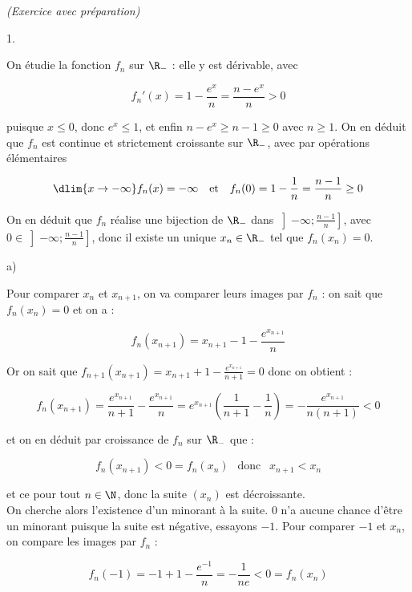 \documentclass[11pt]{article}%
\begin{document}
\begin{exercice}{\it (Exercice avec préparation)}
\begin{noliste}{1.}
 \item On étudie la fonction $f_{n}$ sur $\R_-$ : elle y est dérivable,
avec
 
\[
 f_{n} '(x) = 1 - \frac{ e^{x} }{ n } = \frac{ n - e^{x} }{ n } > 0 
\]

 puisque $x \leq 0$, donc $e^{x} \leq 1$, et enfin $ n - e^{x} \geq n -
1 \geq 0$ avec $n \geq 1$. On en déduit que $f_{n}$ est continue et
strictement croissante sur $\R_-$, avec par opérations élémentaires
 
\[
 \dlim{ x \rightarrow - \infty } f_{n} (x) = - \infty \ \ \text{ et } \
\ f_{n} (0 ) = 1 - \frac{ 1 }{ n } = \frac{ n - 1 }{ n } \geq 0 
\]

 On en déduit que $f_{n}$ réalise une bijection de $\R_-$ dans $ \left]
- \infty ; \frac{n-1}{n} \right]$, avec $0 \in \left] - \infty ;
\frac{n-1}{n} \right]$, donc il existe un unique $x_{n} \in \R_-$ tel
que $f_{n} (x_{n} ) = 0$. \\

 \item \begin{noliste}{a)}
 \setlength{\itemsep}{2mm}

 \item Pour comparer $x_{n}$ et $x_{n + 1}$, on va comparer leurs
images par $f_{n}$ : on sait que $f_{n} (x_{n} ) = 0$ et on a : 
 
\[
 f_{n} (x_{n + 1} ) = x_{n + 1} - 1 - \frac{ e^{ x_{n + 1} } }{ n } 
\]

 Or on sait que $f_{n + 1} (x_{n + 1} ) = x_{n + 1} + 1 - \frac{ e^{
x_{n + 1} } }{ n + 1 } = 0$ donc on obtient : 
 
\[
 f_{n} ( x_{n + 1} ) = \frac{ e^{ x_{n + 1} } }{ n + 1 } - \frac{ e^{
x_{n + 1} } }{ n } = e^{ x_{ n + 1 } } \left( \frac{ 1 }{ n + 1 } -
\frac{ 1 }{ n} \right) = - \frac{ e^{ x_{ n + 1 } } }{ n (n + 1) } < 0 
\]

 et on en déduit par croissance de $f_{n}$ sur $\R_-$ que :
 
\[
 f_{n} (x_{n + 1} ) < 0 = f_{n} (x_{n} ) \ \ \text{ donc } \ \ x_{n +
1} < x_{n} 
\]

 et ce pour tout $n \in \N$, donc la suite $(x_{n})$ est décroissante.
\\

 On cherche alors l'existence d'un minorant à la suite. 0 n'a aucune
chance d'être un minorant puisque la suite est négative, essayons $-1$.
Pour comparer $-1$ et $x_{n}$, on compare les images par $f_{n}$ : 
 
\[
 f_{n} (-1) = -1 + 1 - \frac{ e^{-1} }{ n } = - \frac{ 1 }{ n e } < 0 =
f_{n} ( x_{n} ) 
\]


\end{noliste}
\end{noliste}
\end{exercice}
\end{document}
